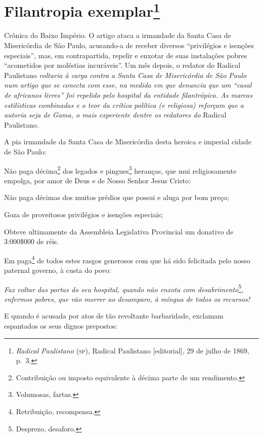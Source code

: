 \chapter{Filantropia exemplar\footnote{\emph{Radical Paulistano} (\textsc{sp}),
  Radical Paulistano {[}editorial{]}, 29 de julho de 1869, p.~3.}}

\begin{didascalia}
Crônica do Baixo Império. O artigo ataca a irmandade da Santa Casa de
Misericórdia de São Paulo, acusando-a de receber diversos ``privilégios e
isenções especiais'', mas, em contrapartida, repelir e enxotar de suas
instalações pobres ``acometidos por moléstias incuráveis''. Um mês depois,
o redator do Radical Paulistano \emph{voltaria à carga contra a Santa
Casa de Misericórdia de São Paulo num artigo que se conecta com esse, na
medida em que denuncia que um ``casal de africanos livres'' foi repelido
pelo hospital da entidade filantrópica. As marcas estilísticas
combinadas e o teor da crítica política (e religiosa) reforçam que a
autoria seja de Gama, o mais experiente dentre os redatores do} Radical
Paulistano\emph{.}
\end{didascalia}



A pia irmandade da Santa Casa de Misericórdia desta heroica e imperial
cidade de São Paulo:

Não paga décima\footnote{Contribuição ou imposto equivalente à décima
  parte de um rendimento.} dos legados e pingues\footnote{Volumosas,
  fartas.} heranças, que mui religiosamente empolga, por amor de Deus e
de Nosso Senhor Jesus Cristo;

Não paga décimas dos muitos prédios que possui e aluga por bom preço;

Goza de proveitosos privilégios e isenções especiais;

Obteve ultimamente da Assembleia Legislativa Provincial um donativo de
3:000\$000 de réis.

Em paga\footnote{Retribuição, recompensa.} de todos estes rasgos
generosos com que há sido felicitada pelo nosso paternal governo, à
custa do povo:

\emph{Faz voltar das portas do seu hospital, quando não enxota com
desabrimento}\footnote{Desprezo, desaforo.}\emph{,} \emph{enfermos
pobres, que vão morrer ao desamparo, à míngua de todos os recursos!}

E quando é acusada por atos de tão revoltante barbaridade, exclamam
espantados os seus dignos prepostos:

